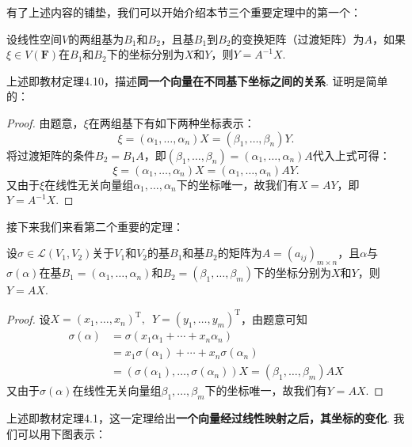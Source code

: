 \begin{solution}

\end{solution}

有了上述内容的铺垫，我们可以开始介绍本节三个重要定理中的第一个：
\begin{theorem}[基的选择对向量坐标的影响]
    设线性空间$V$的两组基为$B_1$和$B_2$，且基$B_1$到$B_2$的变换矩阵（过渡矩阵）为$A$，如果$\xi \in V(\mathbf{F})$在$B_1$和$B_2$下的坐标分别为$X$和$Y$，则$Y=A^{-1}X$.
\end{theorem}
上述即教材定理4.10，描述\textbf{同一个向量在不同基下坐标之间的关系}. 证明是简单的：

\begin{proof}
    由题意，$\xi$在两组基下有如下两种坐标表示：
    \[\xi=(\alpha_1,\ldots,\alpha_n)X=(\beta_1,\ldots,\beta_n)Y.\]
    将过渡矩阵的条件$B_2=B_1A$，即$(\beta_1,\ldots,\beta_n)=(\alpha_1,\ldots,\alpha_n)A$代入上式可得：
    \[\xi=(\alpha_1,\ldots,\alpha_n)X=(\alpha_1,\ldots,\alpha_n)AY.\]
    又由于$\xi$在线性无关向量组$\alpha_1,\ldots,\alpha_n$下的坐标唯一，故我们有$X=AY$，即$Y=A^{-1}X$.
\end{proof}

接下来我们来看第二个重要的定理：
\begin{theorem}[线性映射对向量坐标的影响] \label{thm:11:线性映射对向量坐标的影响}
    设$\sigma \in \mathcal{L}(V_1,V_2)$关于$V_1$和$V_2$的基$B_1$和基$B_2$的矩阵为$A=(a_{ij})_{m \times n}$，且$\alpha$与$\sigma(\alpha)$在基$B_1=(\alpha_1,\ldots,\alpha_n)$和$B_2=(\beta_1,\ldots,\beta_m)$下的坐标分别为$X$和$Y$，则$Y=AX$.
\end{theorem}

\begin{proof}
    设$X=(x_1,\ldots,x_n)^\mathrm{T},\enspace Y=(y_1,\ldots,y_m)^\mathrm{T}$，由题意可知
    \begin{align*}
        \sigma(\alpha) & =\sigma(x_1\alpha_1+\cdots+x_n\alpha_n)                                 \\
                       & =x_1\sigma(\alpha_1)+\cdots+x_n\sigma(\alpha_n)                         \\
                       & =(\sigma(\alpha_1),\ldots,\sigma(\alpha_n))X=(\beta_1,\ldots,\beta_m)AX
    \end{align*}
    又由于$\sigma(\alpha)$在线性无关向量组$\beta_1,\ldots,\beta_m$下的坐标唯一，故我们有$Y=AX$.
\end{proof}

上述即教材定理4.1，这一定理给出\textbf{一个向量经过线性映射之后，其坐标的变化}. 我们可以用下图表示：
\begin{figure}[htbp]
    \centering
\end{figure}

